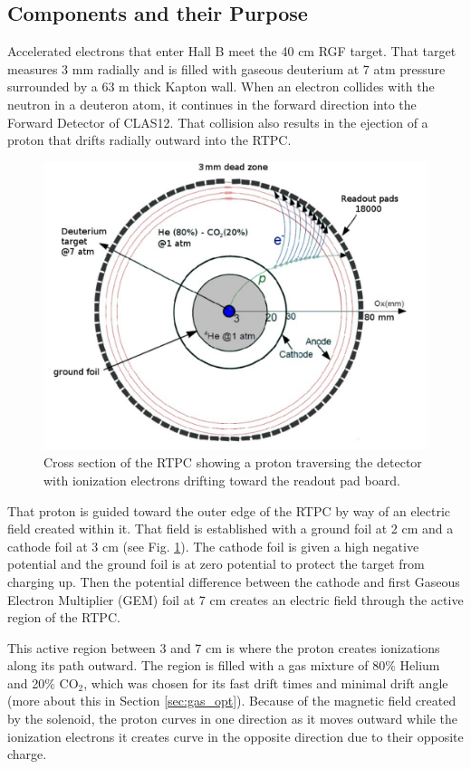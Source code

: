 \subsection{Components and their Purpose}
Accelerated electrons that enter Hall B meet the 40 cm RGF target. That target measures 3 mm radially and is filled with gaseous deuterium at 7 atm pressure surrounded by a 63 \textmu m thick Kapton wall. When an electron collides with the neutron in a deuteron atom, it continues in the forward direction into the Forward Detector of CLAS12. That collision also results in the ejection of a proton that drifts radially outward into the RTPC.

\begin{figure}[h!]
	\centering
	\includegraphics[width=0.8\linewidth]{figures/rtpc_op.png}
	\caption{Cross section of the RTPC showing a proton traversing the detector with ionization electrons drifting toward the readout pad board.}
	\label{fig:rtpc_op}
\end{figure}

That proton is guided toward the outer edge of the RTPC by way of an electric field created within it. That field is established with a ground foil at 2 cm and a cathode foil at 3 cm (see Fig. \ref{fig:rtpc_op}). The cathode foil is given a high negative potential and the ground foil is at zero potential to protect the target from charging up. Then the potential difference between the cathode and first Gaseous Electron Multiplier (GEM) foil at 7 cm creates an electric field through the active region of the RTPC. 

This active region between 3 and 7 cm is where the proton creates ionizations along its path outward. The region is filled with a gas mixture of 80$\%$ Helium and 20$\%$ CO$_2$, which was chosen for its fast drift times and minimal drift angle (more about this in Section \ref{sec:gas_opt}). Because of the magnetic field created by the solenoid, the proton curves in one direction as it moves outward while the ionization electrons it creates curve in the opposite direction due to their opposite charge.

